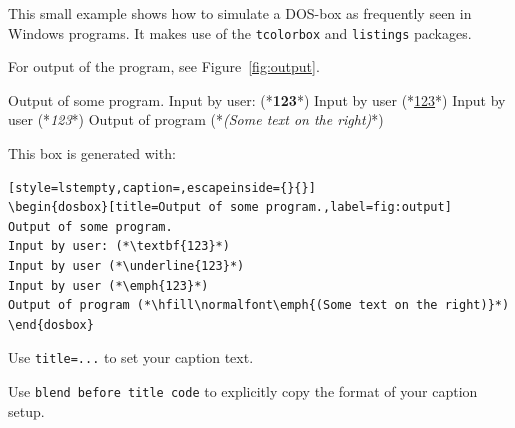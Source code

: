 \documentclass[12pt]{article}
\begin{document}
This small example shows how to simulate a DOS-box as frequently seen in Windows programs.
It makes use of the \texttt{tcolorbox} and \texttt{listings} packages.

For output of the program, see Figure~\ref{fig:output}.

\begin{dosbox}[title=Output of some program.,label=fig:output]
Output of some program.
Input by user: (*\textbf{123}*)
Input by user (*\underline{123}*)
Input by user (*\emph{123}*)
Output of program (*\hfill\normalfont\emph{(Some text on the right)}*)
\end{dosbox}

This box is generated with:

\begin{lstlisting}[style=lstempty,caption=,escapeinside={}{}]
\begin{dosbox}[title=Output of some program.,label=fig:output]
Output of some program.
Input by user: (*\textbf{123}*)
Input by user (*\underline{123}*)
Input by user (*\emph{123}*)
Output of program (*\hfill\normalfont\emph{(Some text on the right)}*)
\end{dosbox}
\end{lstlisting}

Use \texttt{title=...} to set your caption text.

Use \texttt{blend before title code} to explicitly copy the format of your caption setup.
\end{document}
